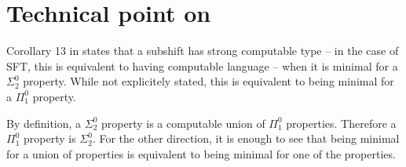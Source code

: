\documentclass[a4paper]{article}
\theoremstyle{definition}
\begin{document}
\section{Technical point on \cite[Corollary 13]{amir_minimality_2025}}

Corollary 13 in \cite{amir_minimality_2025} states that a subshift has strong computable type -- in the case of SFT, this is equivalent to having computable language -- when it is minimal for a $\Sigma^0_2$ property. While not explicitely stated, this is equivalent to being minimal for a $\Pi^0_1$ property.

By definition, a $\Sigma^0_2$ property is a computable union of $\Pi^0_1$ properties. Therefore a $\Pi^0_1$ property is $\Sigma^0_2$. For the other direction, it is enough to see that being minimal for a union of properties is equivalent to being minimal for one of the properties.
\end{document}
